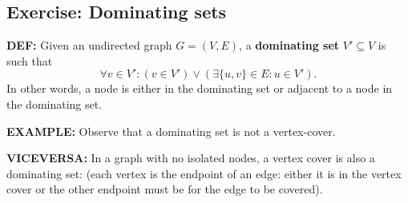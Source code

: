 \subsection{Exercise: Dominating sets}
\begin{notesdefinition}
\textbf{DEF:} Given an undirected graph $G=(V,E)$, a \textbf{dominating set} $V'\subseteq V$ is such that
\[\forall v\in V':(v\in V')\lor(\exists\{u,v\}\in E:u\in V').\]
In other words, a node is either in the dominating set or adjacent to a node in the dominating set.
\end{notesdefinition}

\textbf{EXAMPLE:}
Observe that a dominating set is not a vertex-cover.

\textbf{VICEVERSA:} In a graph with no isolated nodes, a vertex cover is also a dominating set:
(each vertex is the endpoint of an edge: either it is in the vertex cover or the other endpoint must be for the edge to be covered).
